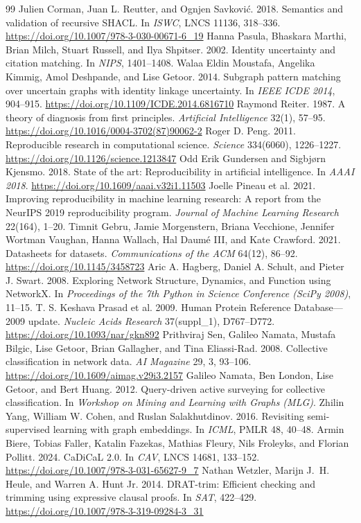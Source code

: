 \begin{thebibliography}{99}
 Julien Corman, Juan L. Reutter, and Ognjen Savkovi\'{c}. 2018. Semantics and validation of recursive SHACL. In \textit{ISWC}, LNCS 11136, 318--336. \url{https://doi.org/10.1007/978-3-030-00671-6_19}
 Hanna Pasula, Bhaskara Marthi, Brian Milch, Stuart Russell, and Ilya Shpitser. 2002. Identity uncertainty and citation matching. In \textit{NIPS}, 1401--1408.
 Walaa Eldin Moustafa, Angelika Kimmig, Amol Deshpande, and Lise Getoor. 2014. Subgraph pattern matching over uncertain graphs with identity linkage uncertainty. In \textit{IEEE ICDE 2014}, 904--915. \url{https://doi.org/10.1109/ICDE.2014.6816710}
 Raymond Reiter. 1987. A theory of diagnosis from first principles. \textit{Artificial Intelligence} 32(1), 57--95. \url{https://doi.org/10.1016/0004-3702(87)90062-2}
 Roger D. Peng. 2011. Reproducible research in computational science. \textit{Science} 334(6060), 1226--1227. \url{https://doi.org/10.1126/science.1213847}
 Odd Erik Gundersen and Sigbj\o rn Kjensmo. 2018. State of the art: Reproducibility in artificial intelligence. In \textit{AAAI 2018}. \url{https://doi.org/10.1609/aaai.v32i1.11503}
 Joelle Pineau et al. 2021. Improving reproducibility in machine learning research: A report from the NeurIPS 2019 reproducibility program. \textit{Journal of Machine Learning Research} 22(164), 1--20.
 Timnit Gebru, Jamie Morgenstern, Briana Vecchione, Jennifer Wortman Vaughan, Hanna Wallach, Hal Daum\'e III, and Kate Crawford. 2021. Datasheets for datasets. \textit{Communications of the ACM} 64(12), 86--92. \url{https://doi.org/10.1145/3458723}
 Aric A. Hagberg, Daniel A. Schult, and Pieter J. Swart. 2008. Exploring Network Structure, Dynamics, and Function using NetworkX. In \textit{Proceedings of the 7th Python in Science Conference (SciPy 2008)}, 11--15.
 T. S. Keshava Prasad et al. 2009. Human Protein Reference Database---2009 update. \textit{Nucleic Acids Research} 37(suppl\_1), D767--D772. \url{https://doi.org/10.1093/nar/gkn892}
 Prithviraj Sen, Galileo Namata, Mustafa Bilgic, Lise Getoor, Brian Gallagher, and Tina Eliassi-Rad. 2008. Collective classification in network data. \textit{AI Magazine} 29, 3, 93--106. \url{https://doi.org/10.1609/aimag.v29i3.2157}
 Galileo Namata, Ben London, Lise Getoor, and Bert Huang. 2012. Query-driven active surveying for collective classification. In \textit{Workshop on Mining and Learning with Graphs (MLG)}.
 Zhilin Yang, William W. Cohen, and Ruslan Salakhutdinov. 2016. Revisiting semi-supervised learning with graph embeddings. In \textit{ICML}, PMLR 48, 40--48.
 Armin Biere, Tobias Faller, Katalin Fazekas, Mathias Fleury, Nils Froleyks, and Florian Pollitt. 2024. CaDiCaL 2.0. In \textit{CAV}, LNCS 14681, 133--152. \url{https://doi.org/10.1007/978-3-031-65627-9_7}
 Nathan Wetzler, Marijn J.~H. Heule, and Warren A. Hunt Jr. 2014. DRAT-trim: Efficient checking and trimming using expressive clausal proofs. In \textit{SAT}, 422--429. \url{https://doi.org/10.1007/978-3-319-09284-3_31}
\end{thebibliography}
